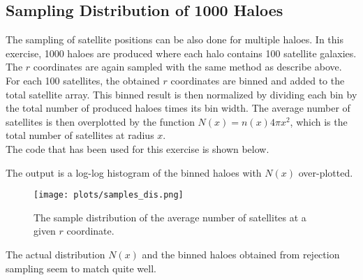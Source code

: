 \subsection{Sampling Distribution of 1000 Haloes}
The sampling of satellite positions can be also done for multiple haloes. In this exercise, 1000 haloes are produced where each halo contains 100 satellite galaxies. The $r$ coordinates are again sampled with the same method as describe above. For each 100 satellites, the obtained $r$ coordinates are binned and added to the total satellite array. This binned result is then normalized by dividing each bin by the total number of produced haloes times its bin width. The average number of satellites is then overplotted by the function $N(x) = n(x)4\pi x^2$, which is the total number of satellites at radius $x$. \\
The code that has been used for this exercise is shown below.


The output is a log-log histogram of the binned haloes with $N(x)$ over-plotted.\\
\begin{figure}[h]
\centering
\texttt{[image: plots/samples\_dis.png]}
\caption{The sample distribution of the average number of satellites at a given $r$ coordinate.}
\end{figure}
The actual distribution $N(x)$ and the binned haloes obtained from rejection sampling seem to match quite well. 
